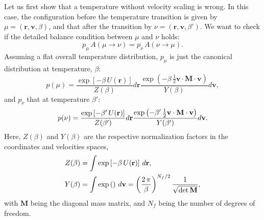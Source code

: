 \documentclass[11pt]{article}
\begin{document}
Let us first show that a temperature without
velocity scaling is wrong.
%
In this case, the configuration before the temperature transition
is given by $\mu = (\mathbf r, \mathbf v, \beta)$,
and that after the transition by
$\nu = (\mathbf r, \mathbf v, \beta')$.
%
We want to check if the detailed balance condition
between $\mu$ and $\nu$ holds:
%
\begin{equation}
  p_\mu \, A(\mu \to \nu)
  =
  p_\nu \, A(\nu \to \mu)
  .
\label{eq:db_novs}
\end{equation}
%
Assuming a flat overall temperature distribution,
$p_\mu$ is just the canonical distribution at temperature, $\beta$:
%
\begin{equation}
  p(\mu)
  =
  \frac{
    \exp\left[
       -\beta \, U(\mathbf r)
    \right]
  }
  {
    Z(\beta)
  }
  d \mathbf r
  \frac{
    \exp\left(
      -\beta \, \frac{1}{2} \mathbf v \cdot \mathbf M \cdot \mathbf v
    \right)
  }
  {
    Y(\beta)
  }
  d \mathbf v
  ,
\label{eq:pmu}
\end{equation}
%
and $p_\nu$ that at temperature $\beta'$:
%
\begin{equation}
  p(\nu)
  =
  \frac{
    \exp\left[
       -\beta' \, U(\mathbf r)
    \right]
  }
  {
    Z(\beta')
  }
  d \mathbf r
  \frac{
    \exp\left(
      -\beta' \, \frac{1}{2} \mathbf v \cdot \mathbf M \cdot \mathbf v
    \right)
  }
  {
    Y(\beta')
  }
  d \mathbf v
  .
\notag
\end{equation}
%
Here, $Z(\beta)$ and $Y(\beta)$
are the respective normalization factors in
the coordinates and velocities spaces,
%
\begin{align}
  Z(\beta)
  &=
  \int \exp\left[ -\beta \, U(\mathbf r) \right] \, d\mathbf r
  ,
  \notag
\\
  Y(\beta)
  &=
  \int \exp\left( \right) \, d\mathbf v
  =
  \left(
    \frac{ 2 \, \pi } { \beta }
  \right)^{ N_f / 2 }
  \frac{
    1
  }
  {
    \sqrt{ \det \mathbf M }
  }
  ,
  \label{eq:Ybeta}
\end{align}
%
with $\mathbf M$ being the diagonal mass matrix,
and $N_f$ being the number of degrees of freedom.
\end{document}
